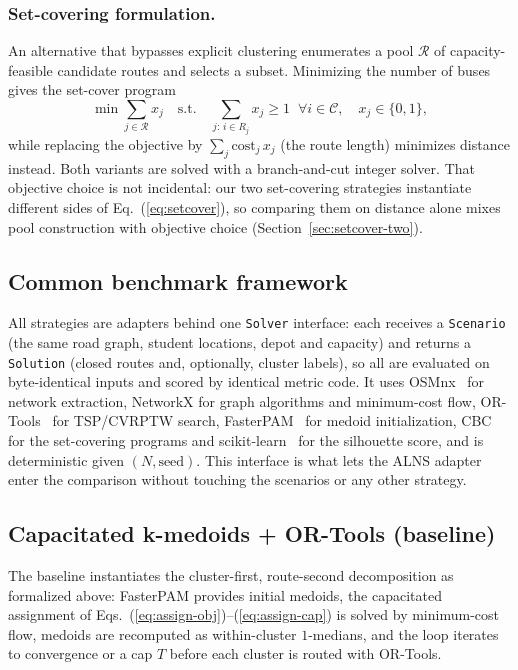 \documentclass[graybox]{SNmult}
\begin{document}
\subsubsection{Set-covering formulation.}\label{sec:setcover-formulation}
An alternative that bypasses explicit clustering enumerates a pool
$\mathcal{R}$ of capacity-feasible candidate routes and selects a
subset. Minimizing the number of buses gives the set-cover program
\begin{equation}
\min \sum_{j\in\mathcal{R}} x_j \quad\text{s.t.}\quad
\sum_{j:\,i\in R_j} x_j \ge 1\;\;\forall i\in\mathcal{C},\quad
x_j\in\{0,1\},
\label{eq:setcover}
\end{equation}
while replacing the objective by $\sum_j \mathrm{cost}_j\,x_j$ (the
route length) minimizes distance instead. Both variants are solved
with a branch-and-cut integer solver. That objective choice is not
incidental: our two set-covering strategies instantiate different sides of
Eq.~(\ref{eq:setcover}), so comparing them on distance alone mixes pool
construction with objective choice (Section~\ref{sec:setcover-two}).

\subsection{Common benchmark framework}\label{sec:framework}
All strategies are adapters behind one \texttt{Solver} interface: each
receives a \texttt{Scenario} (the same road graph, student locations,
depot and capacity) and returns a \texttt{Solution} (closed routes and,
optionally, cluster labels), so all are evaluated on byte-identical inputs
and scored by identical metric code. It uses
OSMnx~\cite{Boeing2017OSMnx} for network extraction, NetworkX for graph
algorithms and minimum-cost flow, OR-Tools~\cite{PerronFurnon2023ORTools}
for TSP/CVRPTW search, FasterPAM~\cite{KaufmanRousseeuw1990PAM} for medoid
initialization, CBC for the set-covering programs and
scikit-learn~\cite{Pedregosa2011Sklearn} for the silhouette score, and is
deterministic given $(N,\text{seed})$. This interface is what lets the
ALNS adapter enter the comparison without touching the scenarios or any
other strategy.

\subsection{Capacitated k-medoids + OR-Tools (baseline)}
The baseline instantiates the cluster-first, route-second decomposition as
formalized above: FasterPAM provides initial medoids, the capacitated
assignment of Eqs.~(\ref{eq:assign-obj})--(\ref{eq:assign-cap}) is solved
by minimum-cost flow, medoids are recomputed as within-cluster
$1$-medians, and the loop iterates to convergence or a cap $T$ before each
cluster is routed with OR-Tools.
\end{document}
